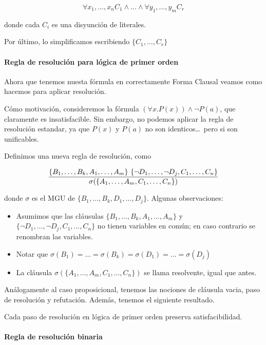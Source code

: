 \[\forall x_1,\dots,x_n C_1 \land \dots \land \forall y_1,\dots,y_m C_r\]

 donde cada $C_i$ es una disyunción de literales.

Por último, lo simplificamos escribiendo $\{C_1, \dots, C_r\}$

\paragraph{Regla de resolución para lógica de primer orden}

Ahora que tenemos nuesta fórmula en correctamente Forma Clausal veamos como hacemos para aplicar resolución.

Cómo motivación, consideremos la fórmula $(\forall x. P(x)) \land \lnot P(a)$, que claramente es insatisfacible. Sin embargo, no podemos aplicar la regla de resolución estandar, ya que $P(x)$ y $P(a)$ no son identicos\dots\ pero si son unificables.

Definimos una nueva regla de resolución, como

\[\resol{\{B_1,\dots,B_k,A_1,\dots,A_m\}\ \{\lnot D_1,\dots,\lnot D_j,C_1,\dots,C_n\}}{\sigma(\{A_1,\dots,A_m, C_1,\dots,C_n\})}\]

donde $\sigma$ es el MGU de $\{B_1,\dots,B_k, D_1,\dots,D_j\}$. Algunas observaciones:
\begin{itemize}
  \item Asumimos que las cláusulas $\{B_1,\dots,B_k,A_1,\dots,A_m\}$ y $\{\lnot D_1,\dots,\lnot D_j,C_1,\dots,C_n\}$ no tienen variables en común; en caso contrario se renombran las variables.
  \item Notar que $\sigma(B_1) = \dots = \sigma(B_k) = \sigma(D_1) = \dots = \sigma(D_j) $
  \item La cláusula $\sigma(\{A_1,\dots,A_m, C_1,\dots,C_n\})$ se llama resolvente, igual que antes.
\end{itemize}

Análogamente al caso proposicional, tenemos las nociones de cláusula vacia, paso de resolución y refutación. Además, tenemos el siguiente resultado.

\begin{teo}
  Cada paso de resolución en lógica de primer orden preserva satisfacibilidad.
\end{teo}

\paragraph{Regla de resolución binaria}

